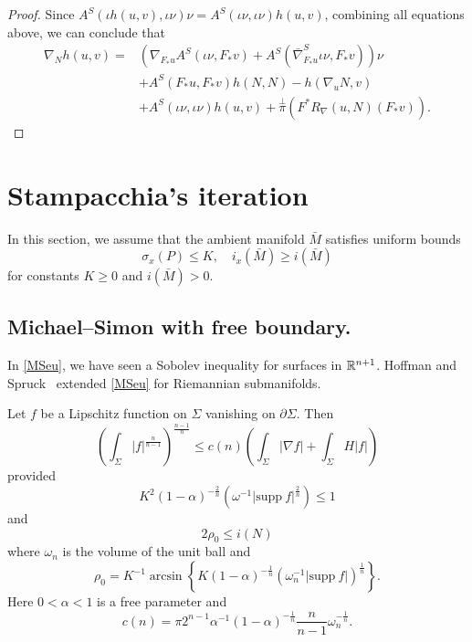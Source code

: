\begin{proof}
    Since $A^S(\iota  h(u,v) , \iota \nu ) \nu =A^S(\iota  \nu  , \iota \nu )h(u,v)$, combining all equations above, we can conclude that 
    \begin{equation*}
        \begin{split}
            \nabla _N h(u,v)
            =& \left( \nabla _{F_*u}A^S(\iota \nu , F_*v)+A^S(\bar{\nabla }^{S}_{F_*u} \iota \nu , F_*v)  \right)   \nu \\
            & +A^S(F_*u, F_* v)h(N,N)-h(\nabla_u N, v) \\
            & + A^S(\iota  \nu  , \iota \nu )h(u,v) +\overset{\perp }{\pi} (F^*R_{\nabla }(u,N)(F_* v)).
    \end{split}
    \end{equation*} 
\end{proof}

\section{Stampacchia's iteration} \label{sec:si}

In this section, we assume that the ambient manifold $\bar{M}$ satisfies uniform bounds
\[\sigma _x(P) \leq K, \quad i_x(\bar{M}) \geq i(\bar{M})\]
for constants $K \geq 0$ and $i(\bar{M})>0$.

\subsection{Michael--Simon with free boundary.}

In \autoref{MSeu}, we have seen a Sobolev inequality for surfaces in $\mathbb{R}^{n+1}$. Hoffman and Spruck~\cite{hoffman_sobolev_1974} extended \autoref{MSeu} for Riemannian submanifolds.

\begin{lemma} \label{MSRie}
    Let $f$ be a Lipschitz function on $\Sigma $ vanishing on $\partial \Sigma $. Then
    \[\left( \int_{\Sigma }^{}\left| f \right| ^{\frac{n}{n-1}} \right) ^{\frac{n-1}{n}}\leq c(n)\left( \int_{\Sigma} \left| \nabla f \right| + \int_{\Sigma} H \left| f \right|  \right) \]
    provided
    \[K^2(1-\alpha )^{-\frac{2}{n}}(\omega^{-1}\left| \mathrm{supp} \ f \right| ^{\frac{2}{n}}) \leq 1\]
    and
    \[2 \rho _0 \leq i(N)\]
    where $\omega_n$ is the volume of the unit ball and
    \[\rho_0=K^{-1}\arcsin \left\{ K(1-\alpha )^{-\frac{1}{n}}\left( \omega _n^{-1}\left|\mathrm{supp}\ f  \right|  \right) ^{\frac{1}{n}} \right\}. \]
    Here $0<\alpha<1 $ is a free parameter and
    \[c(n)=\pi 2^{n-1}\alpha ^{-1}\left( 1-\alpha  \right) ^{-\frac{1}{n}} \frac{n}{n-1} \omega _n^{-\frac{1}{n}}.\]
\end{lemma}


